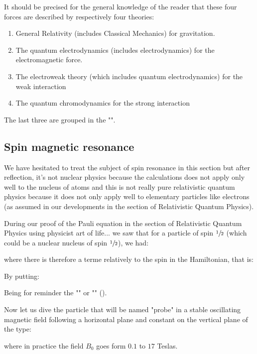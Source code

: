 	It should be precised for the general knowledge of the reader that these four forces are described by respectively four theories:
	\begin{enumerate}
		\item General Relativity (includes Classical Mechanics) for gravitation.

		\item The quantum electrodynamics (includes electrodynamics) for the electromagnetic force.

		\item The electroweak theory (which includes quantum electrodynamics) for the weak interaction

		\item The quantum chromodynamics for the strong interaction
	\end{enumerate}
	The last three are grouped in the "".
	
	\pagebreak
	\subsection{Spin magnetic resonance}
	We have hesitated to treat the subject of spin resonance in this section but after reflection, it's not nuclear physics because the calculations does not apply only well to the nucleus of atoms and this is not really pure relativistic quantum physics because it does not only apply well to elementary particles like electrons (as assumed in our developments in the section  of Relativistic Quantum Physics).

	During our proof of the Pauli equation in the section of Relativistic Quantum Physics using physicist art of life... we saw that for a particle of spin $\sfrac{1}{2}$ (which could be a nuclear nucleus of spin $\sfrac{1}{2}$), we had:
	
	where there is therefore a terme relatively to the spin in the Hamiltonian, that is:
	
	By putting:
	
	Being for reminder the "" or "" ().
	
	Now let us dive the particle that will be named "probe" in a stable oscillating magnetic field following a horizontal plane and constant on the vertical plane of the type:
	
	where in practice the field $B_0$ goes form $0.1$ to $17$ Teslas.


